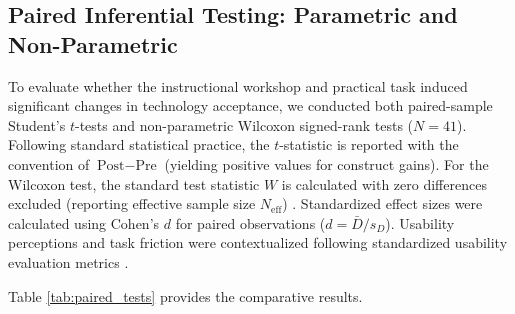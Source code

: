 \documentclass{cleiej}
\begin{document}
\subsection{Paired Inferential Testing: Parametric and Non-Parametric}
To evaluate whether the instructional workshop and practical task induced significant changes in technology acceptance, we conducted both paired-sample Student's $t$-tests and non-parametric Wilcoxon signed-rank tests \cite{wilcoxon1945individual} ($N = 41$). Following standard statistical practice, the $t$-statistic is reported with the convention of $\text{Post} - \text{Pre}$ (yielding positive values for construct gains). For the Wilcoxon test, the standard test statistic $W$ is calculated with zero differences excluded (reporting effective sample size $N_{\text{eff}}$) \cite{wilcoxon1945individual}. Standardized effect sizes were calculated using Cohen's $d$ for paired observations \cite{cohen1988statistical} ($d = \bar{D} / s_D$). Usability perceptions and task friction were contextualized following standardized usability evaluation metrics \cite{finstad2010usability}.

Table \ref{tab:paired_tests} provides the comparative results.

\begin{table}[t]
\centering
\caption{Comparative Statistical Analysis of UTAUT Constructs Before and After Intervention ($N = 41$).}
\label{tab:paired_tests}
\end{table}
\end{document}
